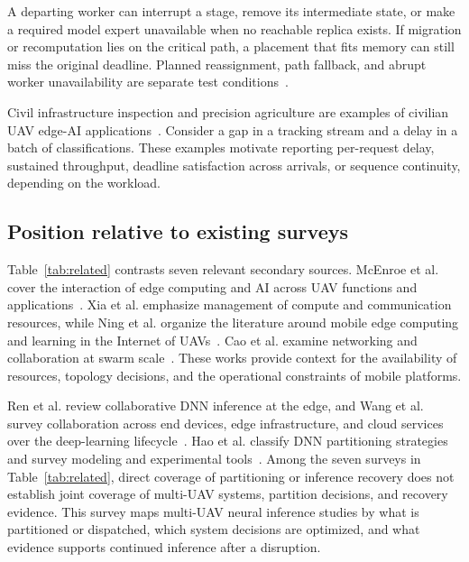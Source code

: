 \documentclass[journal]{IEEEtran}
\begin{document}
A departing worker can interrupt a stage, remove its intermediate state, or make a required model expert unavailable when no reachable replica exists. If migration or recomputation lies on the critical path, a placement that fits memory can still miss the original deadline. Planned reassignment, path fallback, and abrupt worker unavailability are separate test conditions~\cite{R0002,R0038,R0062,R0110,R0118,R0292}.

Civil infrastructure inspection and precision agriculture are examples of civilian UAV edge-AI applications~\cite{survey_uav_edge_ai}. Consider a gap in a tracking stream and a delay in a batch of classifications. These examples motivate reporting per-request delay, sustained throughput, deadline satisfaction across arrivals, or sequence continuity, depending on the workload.

\subsection{Position relative to existing surveys}
Table~\ref{tab:related} contrasts seven relevant secondary sources. McEnroe et al. cover the interaction of edge computing and AI across UAV functions and applications~\cite{survey_uav_edge_ai}. Xia et al. emphasize management of compute and communication resources, while Ning et al. organize the literature around mobile edge computing and learning in the Internet of UAVs~\cite{survey_uav_resource,survey_iouav_mec_ml}. Cao et al. examine networking and collaboration at swarm scale~\cite{survey_uav_swarm_ci}. These works provide context for the availability of resources, topology decisions, and the operational constraints of mobile platforms.

Ren et al. review collaborative DNN inference at the edge, and Wang et al. survey collaboration across end devices, edge infrastructure, and cloud services over the deep-learning lifecycle~\cite{survey_collab_dnn,survey_end_edge_cloud}. Hao et al. classify DNN partitioning strategies and survey modeling and experimental tools~\cite{survey_hao2026}. Among the seven surveys in Table~\ref{tab:related}, direct coverage of partitioning or inference recovery does not establish joint coverage of multi-UAV systems, partition decisions, and recovery evidence. This survey maps multi-UAV neural inference studies by what is partitioned or dispatched, which system decisions are optimized, and what evidence supports continued inference after a disruption.
\end{document}
